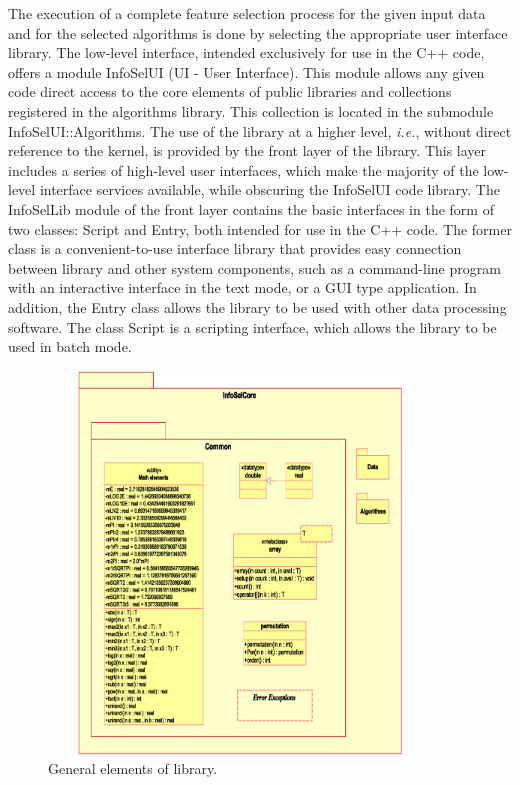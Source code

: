 \documentclass[a4paper,fleqn]{report}
\def\ie{{\em i.e.}}
\begin{document}
The execution of a complete feature selection process for the given input data and for the selected algorithms is done 
by selecting the appropriate user interface library.  The low-level interface, intended exclusively for use in the C++ code,
offers a module InfoSelUI (UI - User Interface). This module allows any given code direct access to the core elements of public libraries and collections registered in the algorithms library. 
This collection is located in the submodule InfoSelUI::Algorithms.  
The use of the library at a higher level, \ie, without direct reference to the kernel, 
is provided by the front layer of the library. 
This layer includes a series of high-level user interfaces, 
which make the majority of the low-level interface services available, while obscuring the InfoSelUI code library. 
The InfoSelLib module of the front layer contains the basic interfaces in the form of two classes: Script and Entry, 
both intended for use in the C++ code. The former class is a convenient-to-use interface library that provides easy connection 
between library and other system components, such as a command-line program with an interactive interface in the text mode, 
or a GUI type application. In addition, the Entry class allows the library to be used with other data processing software.
The class Script is a scripting interface, which allows the library to be used in batch mode.

\begin{figure}[!h] \label{pic:lib-generalelments}
  \begin{center}
    \includegraphics[height=4in,width=4in]{./figs/Lib-generalelements.eps}
  \end{center}
  \caption{\small General elements of library.}
\end{figure}
\end{document}
